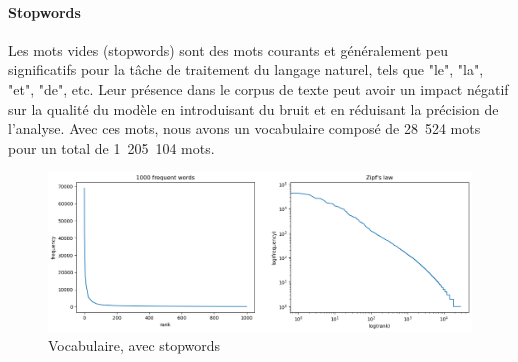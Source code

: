 \documentclass{article}
\begin{document}
\paragraph{Stopwords}
Les mots vides (stopwords) sont des mots courants et généralement peu significatifs pour la tâche de traitement du langage naturel, tels que "le", "la", "et", "de", etc. Leur présence dans le corpus de texte peut avoir un impact négatif sur la qualité du modèle en introduisant du bruit et en réduisant la précision de l'analyse. Avec ces mots, nous avons un vocabulaire composé de 28~524 mots pour un total de 1~205~104 mots.

\begin{figure}[H]
    \centering
    \includegraphics[width=\textwidth]{./src/locuteur/zipfs_nostopwords.png}
    \caption{Vocabulaire, avec stopwords}
    \label{zipfs_nostopwords_pres}
\end{figure}
\end{document}
